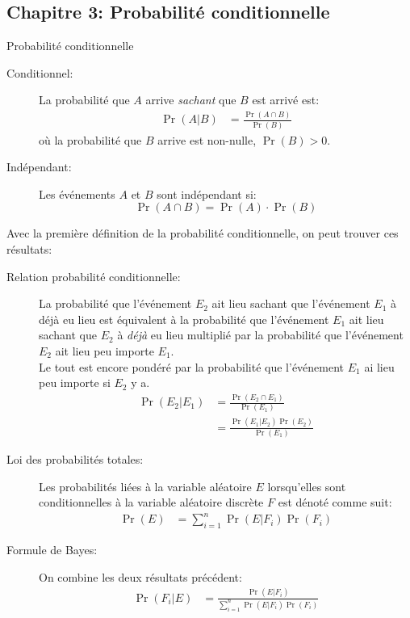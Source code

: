 \documentclass[10pt, french]{article}
\begin{document}
\begin{multicols*}{3}
\section{Chapitre 3: Probabilité conditionnelle}
\begin{probch3}{Probabilité conditionnelle}
\begin{description}
	\item[Conditionnel:]	La probabilité que $A$ arrive \textit{sachant} que $B$ est arrivé est: 
	\begin{align*}
		\Pr(A | B) 
		&= 	\frac{\Pr(A \cap B)}{\Pr(B)}	
	\end{align*}
	où la probabilité que $B$ arrive est non-nulle, $\Pr(B) > 0$.
	\item[Indépendant:]	Les événements $A$ et $B$ sont indépendant si:
	\begin{equation*}
		\Pr(A \cap B) = \Pr(A) \cdot \Pr(B)
	\end{equation*}
\end{description}
Avec la première définition de la probabilité conditionnelle, on peut trouver ces résultats:
\begin{description}
	\item[Relation probabilité conditionnelle: ]	La probabilité que l'événement $E_{2}$ ait lieu sachant que l'événement $E_{1}$ à déjà eu lieu est équivalent à la probabilité que l'événement $E_{1}$ ait lieu sachant que $E_{2}$ à \textit{déjà} eu lieu multiplié par la probabilité que l'événement $E_{2}$ ait lieu peu importe $E_{1}$. \\
	Le tout est encore pondéré par la probabilité que l'événement $E_{1}$ ai lieu peu importe si $E_{2}$ y a.
	\begin{align*}
		\Pr(E_{2} | E_{1})
		&= 	\frac{\Pr(E_{2} \cap E_{1})}{\Pr(E_{1})}		\\
		&=	\frac{\Pr(E_{1} | E_{2}) \Pr(E_{2})}{\Pr(E_{1})}		
	\end{align*}
	\item[Loi des probabilités totales: ]	Les probabilités liées à la variable aléatoire $E$ lorsqu'elles sont conditionnelles à la variable aléatoire discrète $F$ est dénoté comme suit:
	\begin{align*}
		\Pr(E)	&=	\sum_{i = 1}^{n} \Pr(E | F_{i}) \Pr(F_{i})
	\end{align*}
	\item[Formule de Bayes: ]	On combine les deux résultats précédent:
	\begin{align*}
		\Pr(F_{i} | E)
		&=	\frac{\Pr(E | F_{i})}{\sum_{i = 1}^{n} \Pr(E | F_{i}) \Pr(F_{i})}
	\end{align*}
\end{description}
\end{probch3}

\end{multicols*}
\end{document}
